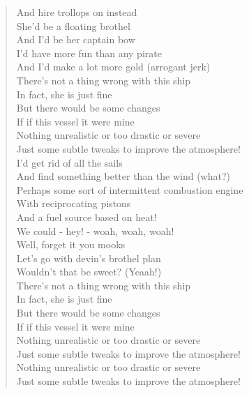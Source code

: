 \documentclass[11pt]{article}
\begin{document}
\begin{verse}
And hire trollops on instead\\
She'd be a floating brothel\\
And I'd be her captain bow\\
I'd have more fun than any pirate\\
And I'd make a lot more gold (arrogant jerk)\\
\vspace*{1em}
There's not a thing wrong with this ship\\
In fact, she is just fine\\
But there would be some changes\\
If if this vessel it were mine\\
Nothing unrealistic or too drastic or severe\\
Just some subtle tweaks to improve the atmosphere!\\
\vspace*{1em}
I'd get rid of all the sails\\
And find something better than the wind (what?)\\
Perhaps some sort of intermittent combustion engine\\
With reciprocating pistons\\
And a fuel source based on heat!\\
We could - hey! - woah, woah, woah!\\
Well, forget it you mooks\\
Let's go with devin's brothel plan\\
Wouldn't that be sweet? (Yeaah!)\\
\vspace*{1em}
There's not a thing wrong with this ship\\
In fact, she is just fine\\
But there would be some changes\\
If if this vessel it were mine\\
Nothing unrealistic or too drastic or severe\\
Just some subtle tweaks to improve the atmosphere!\\
Nothing unrealistic or too drastic or severe\\
Just some subtle tweaks to improve the atmosphere!\\
\end{verse}
\clearpage
\end{document}
